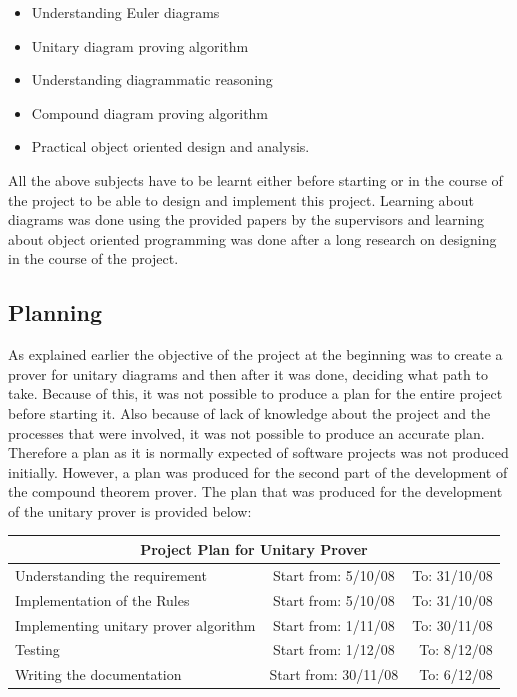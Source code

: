 \documentclass[10pt, a4paper, titlepage]{article}
\begin{document}
\begin{itemize}
\item Understanding Euler diagrams
\item Unitary diagram proving algorithm
\item Understanding diagrammatic reasoning
\item Compound diagram proving algorithm
\item Practical object oriented design and analysis.
\end{itemize}

All the above subjects have to be learnt either before starting or in the course of the project to be able to design and implement this project. Learning about diagrams was done using the provided papers by the supervisors and learning about object oriented programming was done after a long research on designing in the course of the project.

\subsection{Planning}
As explained earlier the objective of the project at the beginning was to create a prover for unitary diagrams and then after it was done, deciding what path to take. Because of this, it was not possible to produce a plan for the entire project before starting it. Also because of lack of knowledge about the project and the processes that were involved, it was not possible to produce an accurate plan. Therefore a plan as it is normally expected of software projects was not produced initially. However, a plan was produced for the second part of the development of the compound theorem prover. The plan that was produced for the development of the unitary prover is provided below:\\

  
\begin{tabular}{| l | c | r | }
\hline
\multicolumn{3}{|c|}{Project Plan for Unitary Prover} \\
\hline	
  Understanding the requirement & Start from: 5/10/08 & To: 31/10/08 \\ \hline	
  Implementation of the Rules  & Start from: 5/10/08 & To: 31/10/08 \\ \hline	
  Implementing unitary prover algorithm & Start from: 1/11/08 & To: 30/11/08\\ \hline	
  Testing & Start from: 1/12/08 & To: 8/12/08\\ \hline	
  Writing the documentation & Start from: 30/11/08 & To: 6/12/08 \\
\hline	
\end{tabular}
\end{document}
